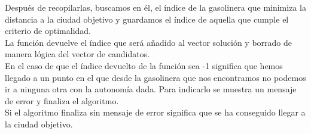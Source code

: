 \documentclass[11pt,a4paper]{article} %
\begin{document}
Después de recopilarlas, buscamos en él, el índice de la gasolinera que minimiza la distancia a la ciudad objetivo y guardamos el índice de aquella que cumple el criterio de optimalidad.\\

La función devuelve el índice que será añadido al vector solución y borrado de manera lógica del vector de candidatos.\\

En el caso de que el índice devuelto de la función sea -1 significa que hemos llegado a un punto en el que desde la gasolinera que nos encontramos no podemos ir a ninguna otra con la autonomía dada. Para indicarlo se muestra un mensaje de error y finaliza el algoritmo.\\

Si el algoritmo finaliza sin mensaje de error significa que se ha conseguido llegar a la ciudad objetivo.\\
\end{document}
